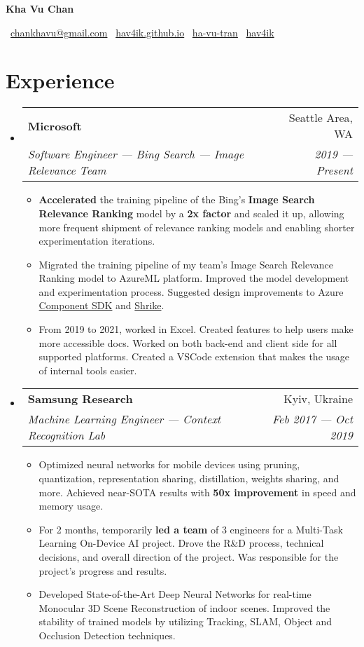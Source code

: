 \documentclass[letterpaper,11pt]{article}
\makeatletter
\newcommand{\resumeItem}[1]{
  \item[--]\small{
    {#1 \vspace{-2pt}}
  }
}
\newcommand{\resumeSubheading}[4]{
  \vspace{-1pt}\item
    \begin{tabular*}{0.97\textwidth}{l@{\extracolsep{\fill}}r}
      \textbf{#1} & #2 \\
      \textit{\small#3} & \textit{\small #4} \\
    \end{tabular*}\vspace{-5pt}
}
\newcommand{\resumeSubHeadingListStart}{\begin{itemize}[leftmargin=*]}
\newcommand{\resumeSubHeadingListEnd}{\end{itemize}}
\newcommand{\resumeItemListStart}{\begin{itemize}[leftmargin=*]}
\newcommand{\resumeItemListEnd}{\end{itemize}\vspace{-5pt}}
\makeatother
\begin{document}


\centerline{\textbf{{\LARGE Kha Vu Chan}}}\medskip
\centerline{
\faEnvelope \, \href{mailto:chankhavu@gmail.com}{chankhavu@gmail.com} \quad
\faLink \, \href{https://hav4ik.github.io/}{hav4ik.github.io} \quad
\faLinkedinSquare \, \href{https://www.linkedin.com/in/ha-vu-tran/}{ha-vu-tran} \quad
\faGithub \, \href{https://github.com/hav4ik}{hav4ik}
}


\section{Experience}
  \resumeSubHeadingListStart

    \resumeSubheading
      {Microsoft}{Seattle Area, WA}
      {Software Engineer --- Bing Search --- Image Relevance Team}{2019 --- Present}
      \resumeItemListStart
        \resumeItem{{\bf Accelerated} the training pipeline of the Bing's {\bf Image Search Relevance Ranking} model by a {\bf 2x factor} and scaled it up, allowing more frequent shipment of relevance ranking models and enabling shorter experimentation iterations.}
        \resumeItem{Migrated the training pipeline of my team's Image Search Relevance Ranking model to AzureML platform. Improved the model development and experimentation process. Suggested design improvements to Azure \href{https://componentsdk.z22.web.core.windows.net/}{Component SDK} and \href{https://github.com/Azure/shrike}{Shrike}.}
        \resumeItem{From 2019 to 2021, worked in Excel. Created features to help users make more accessible docs. Worked on both back-end and client side for all supported platforms. Created a VSCode extension that makes the usage of internal tools easier.}
      \resumeItemListEnd

    \resumeSubheading
      {Samsung Research}{Kyiv, Ukraine}
      {Machine Learning Engineer --- Context Recognition Lab}{Feb 2017 --- Oct 2019}
      \resumeItemListStart
        \resumeItem
          {Optimized neural networks for mobile devices using pruning, quantization, representation sharing, distillation, weights sharing, and more. Achieved near-SOTA results with {\bf 50x improvement} in speed and memory usage.}
        \resumeItem
          {For 2 months, temporarily {\bf led a team} of 3 engineers for a Multi-Task Learning On-Device AI project. Drove the R\&D process, technical decisions, and overall direction of the project. Was responsible for the project's progress and results.}
        \resumeItem
          {Developed State-of-the-Art Deep Neural Networks for real-time Monocular 3D Scene Reconstruction of indoor scenes. Improved the stability of trained models by utilizing Tracking, SLAM, Object and Occlusion Detection techniques.}
      \resumeItemListEnd
  \resumeSubHeadingListEnd
\end{document}
